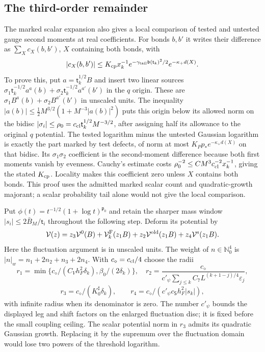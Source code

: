 \documentclass[11pt,letterpaper,reqno]{amsart}
\theoremstyle{definition}
\theoremstyle{remark}
\begin{document}
\subsection{The third-order remainder}

The marked scalar expansion also gives a local comparison
of tested and untested gauge second moments at real
coefficients.  For bonds $b,b'$ it writes their difference
as $\sum_Xc_X(b,b')$, $X$ containing both bonds, with
\[
 |c_X(b,b')|\le K_{\rm cp}x_k^{-1}
 e^{-\gamma_{\rm tail}\mathfrak b(\mathsf t_k)^2/2}
                                  e^{-\kappa_+d(X)}.
\]
To prove this, put $a=\mathsf t_k^{1/2}B$ and insert two linear sources
$\sigma_1\mathsf t_k^{-1/2}a^a(b)+
\sigma_2\mathsf t_k^{-1/2}a^{a'}(b')$ in the $q$ origin.
These are $\sigma_1B^a(b)+\sigma_2B^{a'}(b')$ in unscaled units.
The inequality
$|a(b)|\le\tfrac12M^{3/2}(1+M^{-3}|a(b)|^2)$
puts this origin below its allowed norm on the bidisc
$|\sigma_i|\le\rho_0=c_{\rm cl}\mathsf t_k^{1/2}M^{-3/2}$,
after assigning half its allowance to the original $q$
potential.  The tested logarithm minus the untested
Gaussian logarithm is exactly the part marked by test
defects, of norm at most $K_Pp_*e^{-\kappa_+d(X)}$ on
that bidisc.  Its $\sigma_1\sigma_2$ coefficient is the
second-moment difference because both first moments
vanish by evenness.  Cauchy's estimate costs
$\rho_0^{-2}\le CM^3c_{\rm cl}^{-2}x_k^{-1}$, giving
the stated $K_{\rm cp}$.  Locality makes this coefficient
zero unless $X$ contains both bonds.  This proof uses
the admitted marked scalar count and quadratic-growth
majorant; a scalar probability tail alone would not
give the local comparison.

Put $\phi(t)=t^{-1/2}(1+\log t)^{\mathfrak p_0}$ and
retain the sharper mass window
$|s_i|\le2\bar B_M/\mathsf t_i$ throughout the following step.
Deform its potential by
\[
 \mathcal V(z)=z_3\mathcal V^0(B)+
 \mathcal V_k^{\rm F}(z_1B)+z_2\mathcal V^{\rm old}(z_1B)
                                  +z_4\mathcal V^{\rm s}(z_1B).
\]
Here the fluctuation argument is in unscaled units.
The weight of $n\in\mathbb N_0^4$ is
$|n|_w=n_1+2n_2+n_3+2n_4$.
With $c_\diamond=c_{\rm cl}/4$ choose the radii
\[
 r_1=\min\{c_\diamond/(C_Vh_F^2\delta_k),
                                  \beta_0/(2\delta_k)\},
 \quad r_2=\frac{c_\diamond}
 {c'_\psi\sum_{j\le k}C_7L^{(k+1-j)/4}\varepsilon_j},
\]
\[
 r_3=c_\diamond/(K_0^\sharp\delta_k),\qquad
 r_4=c_\diamond/(c'_\psi c_{\mathsf S}h_F^2|s_k|),
\]
with infinite radius when its denominator is zero.
The number $c'_\psi$ bounds the displayed leg and shift
factors on the enlarged fluctuation disc; it is fixed before
the small coupling ceiling.  The scalar potential norm in
$r_3$ admits its quadratic Gaussian growth.  Replacing it
by the supremum over the fluctuation domain would lose
two powers of the threshold logarithm.
\end{document}
